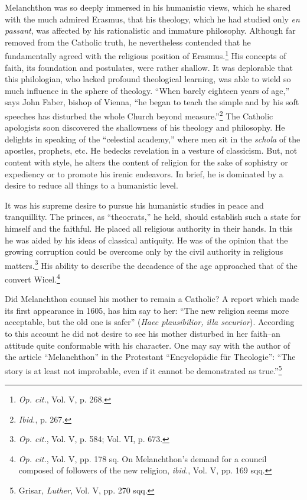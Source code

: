 Melanchthon was so deeply immersed in his humanistic views,
which he shared with the much admired Erasmus, that his theology,
which he had studied only \textit{en passant}, was affected by his rationalistic
and immature philosophy. Although far removed from the Catholic
truth, he nevertheless contended that he fundamentally agreed with
the religious position of Erasmus.\footnote{\textit{Op. cit.}, Vol. V, p. 268.}
 His concepts of faith, its foundation
and postulates, were rather shallow. It was deplorable that
this philologian, who lacked profound theological learning, was able
to wield so much influence in the sphere of theology. “When barely
eighteen years of age,” says John Faber, bishop of Vienna, “he began
to teach the simple and by his soft speeches has disturbed the whole
Church beyond measure.”\footnote{\textit{Ibid.}, p. 267.}
The Catholic apologists soon discovered
the shallowness of his theology and philosophy. He delights in speaking
of the “celestial academy,” where men sit in the \textit{schola} of the
apostles, prophets, etc. He bedecks revelation in a vesture of classicism.
But, not content with style, he alters the content of religion
for the sake of sophistry or expediency or to promote his irenic endeavors.
In brief, he is dominated by a desire to reduce all things to
a humanistic level.

It was his supreme desire to pursue his humanistic studies in peace
and tranquillity. The princes, as “theocrats,” he held, should establish
such a state for himself and the faithful. He placed all religious
authority in their hands. In this he was aided by his ideas of classical
antiquity. He was of the opinion that the growing corruption
could be overcome only by the civil authority in religious matters.\footnote{\textit{Op. cit.}, Vol. V, p. 584; Vol. VI, p. 673.}
His ability to describe the decadence of the age approached that of
the convert Wicel.\footnote
{\textit{Op. cit.}, Vol. V, pp. 178 sq. On Melanchthon’s demand for a council composed of
followers of the new religion, \textit{ibid.}, Vol. V, pp. 169 sqq.}

Did Melanchthon counsel his mother to remain a Catholic? A
report which made its first appearance in 1605, has him say to her:
“The new religion seems more acceptable, but the old one is safer”
(\textit{Haec plausibilior, illa securior}). According to this account he did
not desire to see his mother disturbed in her faith--an attitude quite
conformable with his character. One may say with the author of the
article “Melanchthon” in the Protestant “Encyclopädie für Theologie”:
“The story is at least not improbable, even if it cannot be
demonstrated as true.”\footnote{Grisar, \textit{Luther}, Vol. V, pp. 270 sqq.}

